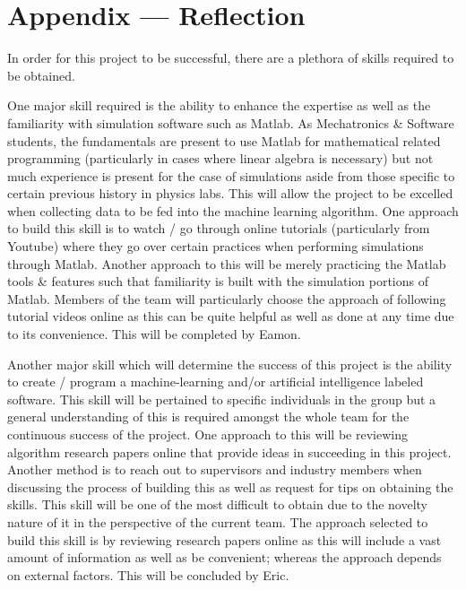 \documentclass[12pt, titlepage]{article}
\begin{document}
\section*{Appendix --- Reflection}
In order for this project to be successful, there are a plethora of skills required to be obtained. 
\par
One major skill required is the ability to enhance the expertise as well as the familiarity with simulation software such as Matlab. As Mechatronics & Software students, the fundamentals are present to use Matlab for mathematical related programming (particularly in cases where linear algebra is necessary) but not much experience is present for the case of simulations aside from those specific to certain previous history in physics labs. This will allow the project to be excelled when collecting data to be fed into the machine learning algorithm. One approach to build this skill is to watch / go through online tutorials (particularly from Youtube) where they go over certain practices when performing simulations through Matlab. Another approach to this will be merely practicing the Matlab tools & features such that familiarity is built with the simulation portions of Matlab. Members of the team will particularly choose the approach of following tutorial videos online as this can be quite helpful as well as done at any time due to its convenience. This will be completed by Eamon. 
\par
Another major skill which will determine the success of this project is the ability to create / program a machine-learning and/or artificial intelligence labeled software. This skill will be pertained to specific individuals in the group but a general understanding of this is required amongst the whole team for the continuous success of the project. One approach to this will be reviewing algorithm research papers online that provide ideas in succeeding in this project. Another method is to reach out to supervisors and industry members when discussing the process of building this as well as request for tips on obtaining the skills. This skill will be one of the most difficult to obtain due to the novelty nature of it in the perspective of the current team. The approach selected to build this skill is by reviewing research papers online as this will include a vast amount of information as well as be convenient; whereas the approach depends on external factors. This will be concluded by Eric.
\par
\end{document}
